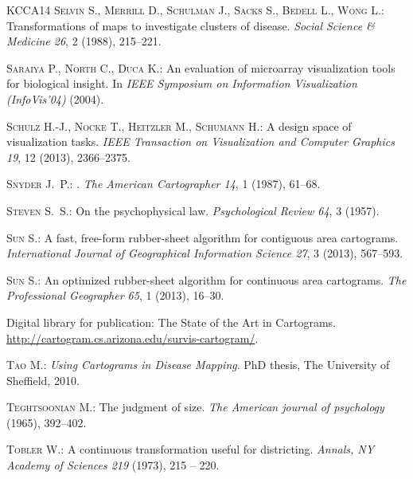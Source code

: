 \documentclass{egpubl}
\begin{document}
\begin{thebibliography}{\uppercase{KCCA{\etalchar{*}}14}}
\textsc{Selvin S., Merrill D., Schulman J., Sacks S., Bedell L., Wong L.}:
\newblock Transformations of maps to investigate clusters of disease.
\newblock \emph{Social Science \& Medicine 26}, 2 (1988), 215--221.

\textsc{Saraiya P., North C., Duca K.}:
\newblock An evaluation of microarray visualization tools for biological
  insight.
\newblock In \emph{IEEE Symposium on Information Visualization (InfoVis'04)}
  (2004).

\textsc{Schulz H.-J., Nocke T., Heitzler M., Schumann H.}:
\newblock A design space of visualization tasks.
\newblock \emph{{IEEE} Transaction on Visualization and Computer Graphics 19},
  12 (2013), 2366--2375.

\textsc{Snyder J.~P.}:
.
\newblock \emph{The American Cartographer 14}, 1 (1987), 61--68.

\textsc{Steven S.~S.}:
\newblock On the psychophysical law.
\newblock \emph{Psychological Review 64}, 3 (1957).

\textsc{Sun S.}:
\newblock A fast, free-form rubber-sheet algorithm for contiguous area
  cartograms.
\newblock \emph{International Journal of Geographical Information Science 27},
  3 (2013), 567--593.

\textsc{Sun S.}:
\newblock An optimized rubber-sheet algorithm for continuous area cartograms.
\newblock \emph{The Professional Geographer 65}, 1 (2013), 16--30.

{Digital library for publication: The State of the Art in Cartograms}.
\newblock \url{http://cartogram.cs.arizona.edu/survis-cartogram/}.

\textsc{Tao M.}:
\newblock \emph{Using Cartograms in Disease Mapping}.
\newblock PhD thesis, The University of Sheffield, 2010.

\textsc{Teghtsoonian M.}:
\newblock The judgment of size.
\newblock \emph{The American journal of psychology} (1965), 392--402.

\textsc{Tobler W.}:
\newblock A continuous transformation useful for districting.
\newblock \emph{Annals, {NY} Academy of Sciences 219} (1973), 215 -- 220.


\end{thebibliography}
\end{document}
